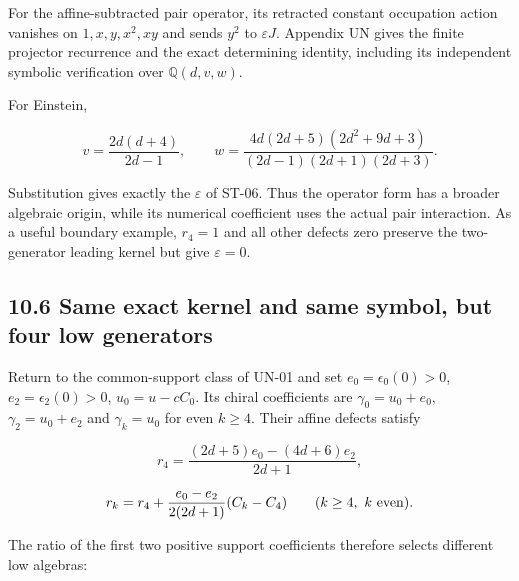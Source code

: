 \documentclass[a4paper,11pt]{article}
\numberwithin{equation}{section}
\begin{document}
For the affine-subtracted pair operator, its retracted constant occupation action vanishes on \(1,x,y,x^2,xy\) and sends \(y^2\) to \(\varepsilon J\). Appendix UN gives the finite projector recurrence and the exact determining identity, including its independent symbolic verification over \(\mathbb Q(d,v,w)\).

For Einstein,

\[
v=\frac{2d(d+4)}{2d-1},\qquad
w=\frac{4d(2d+5)(2d^2+9d+3)}
{(2d-1)(2d+1)(2d+3)}.
\]

Substitution gives exactly the \(\varepsilon\) of ST-06. Thus the operator form has a broader algebraic origin, while its numerical coefficient uses the actual pair interaction. As a useful boundary example, \(r_4=1\) and all other defects zero preserve the two-generator leading kernel but give \(\varepsilon=0\).

\hypertarget{same-exact-kernel-and-same-symbol-but-four-low-generators}{%
\subsection{10.6 Same exact kernel and same symbol, but four low generators}\label{same-exact-kernel-and-same-symbol-but-four-low-generators}}

Return to the common-support class of UN-01 and set \(e_0=\epsilon_0(0)>0\), \(e_2=\epsilon_2(0)>0\), \(u_0=u-cC_0\). Its chiral coefficients are \(\gamma_0=u_0+e_0\), \(\gamma_2=u_0+e_2\) and \(\gamma_k=u_0\) for even \(k\geq4\). Their affine defects satisfy

\[
r_4=\frac{(2d+5)e_0-(4d+6)e_2}{2d+1},
\]

\[
r_k=r_4+\frac{e_0-e_2}{2(2d+1)}(C_k-C_4)
\qquad(k\geq4,\ k\ {\rm even}).
\]

The ratio of the first two positive support coefficients therefore selects different low algebras:
\end{document}
